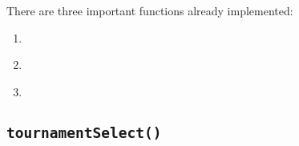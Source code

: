 \documentclass[letterpaper,10pt,english]{sphinxmanual}
\begin{document}
There are three important functions already implemented:
\begin{enumerate}
\item {} 
{\hyperref[Overview:tournamentSelect]{}}

\item {} 
{\hyperref[Overview:rouletteWheelSelect]{}}

\item {} 
{\hyperref[Overview:getRouletteWheel]{}}

\end{enumerate}


\subsection{\texttt{tournamentSelect()}}
\label{Overview:tournamentselect}
\end{document}
